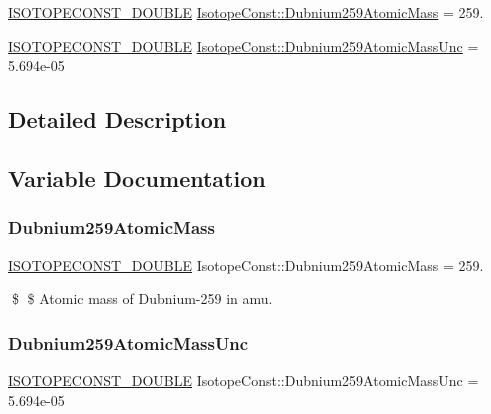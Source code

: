 \begin{DoxyCompactItemize}
\item 
\mbox{\hyperlink{group___isotope_const-_macros_ga8f45a7272ce02c0b4c65c44636ed719a}{I\+S\+O\+T\+O\+P\+E\+C\+O\+N\+S\+T\+\_\+\+D\+O\+U\+B\+LE}} \mbox{\hyperlink{group___isotope_const-_dubnium-_db259_ga1e69fc7bfa5a239461a602fc0e4f8d50}{Isotope\+Const\+::\+Dubnium259\+Atomic\+Mass}} = 259.
\item 
\mbox{\hyperlink{group___isotope_const-_macros_ga8f45a7272ce02c0b4c65c44636ed719a}{I\+S\+O\+T\+O\+P\+E\+C\+O\+N\+S\+T\+\_\+\+D\+O\+U\+B\+LE}} \mbox{\hyperlink{group___isotope_const-_dubnium-_db259_ga4839efb6895553c527b0ebc8f99855ce}{Isotope\+Const\+::\+Dubnium259\+Atomic\+Mass\+Unc}} = 5.\+694e-\/05
\end{DoxyCompactItemize}


\subsection{Detailed Description}


\subsection{Variable Documentation}
\mbox{\label{group___isotope_const-_dubnium-_db259_ga1e69fc7bfa5a239461a602fc0e4f8d50}} 
\subsubsection{\texorpdfstring{Dubnium259\+Atomic\+Mass}{Dubnium259AtomicMass}}
{\footnotesize\ttfamily \mbox{\hyperlink{group___isotope_const-_macros_ga8f45a7272ce02c0b4c65c44636ed719a}{I\+S\+O\+T\+O\+P\+E\+C\+O\+N\+S\+T\+\_\+\+D\+O\+U\+B\+LE}} Isotope\+Const\+::\+Dubnium259\+Atomic\+Mass = 259.}

\$ \$ Atomic mass of Dubnium-\/259 in amu. \mbox{\label{group___isotope_const-_dubnium-_db259_ga4839efb6895553c527b0ebc8f99855ce}} 
\subsubsection{\texorpdfstring{Dubnium259\+Atomic\+Mass\+Unc}{Dubnium259AtomicMassUnc}}
{\footnotesize\ttfamily \mbox{\hyperlink{group___isotope_const-_macros_ga8f45a7272ce02c0b4c65c44636ed719a}{I\+S\+O\+T\+O\+P\+E\+C\+O\+N\+S\+T\+\_\+\+D\+O\+U\+B\+LE}} Isotope\+Const\+::\+Dubnium259\+Atomic\+Mass\+Unc = 5.\+694e-\/05}

